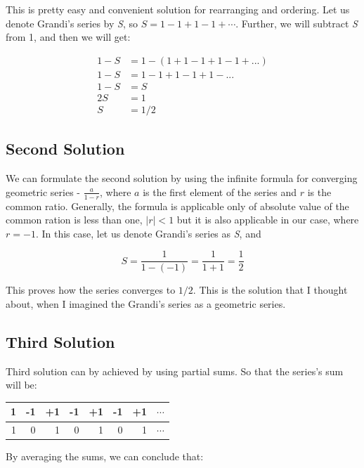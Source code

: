 \documentclass[a4paper]{article}
\begin{document}
This is pretty easy and convenient solution for rearranging and ordering. Let us
denote Grandi’s series by \emph{S}, so $S=1-1+1-1+\cdots$. Further, we will
subtract \emph{S} from 1, and then we will get: 

\begin{align*}
  1-S&=1-(1+1-1+1-1+...)\\
  1-S&=1-1+1-1+1-...\\
  1-S&=S\\
  2S&=1\\
  S&=1/2
\end{align*}

\subsection{Second Solution}
\label{sec-2-2}
\label{sec:second}

We can formulate the second solution by using the infinite formula for
converging geometric series - $\frac{a}{1-r}$, where $a$ is the first element of
the series and $r$ is the common ratio. Generally, the formula is applicable
only of absolute value of the common ration is less than one, $|r| < 1$ but it
is also applicable in our case, where $r = - 1$. In this case, let us denote
Grandi's series as \emph{S}, and 

\begin{equation*}
S=\frac{1}{1-(-1)}=\frac{1}{1+1}=\frac{1}{2}
\end{equation*}

This proves how the series converges to $1/2$. This is the solution that I
thought about, when I imagined the Grandi's series as a geometric series.

\subsection{Third Solution}
\label{sec-2-3}
\label{sec:third}

Third solution can by achieved by using partial sums. So that the series's sum
will be: 

\begin{center}
\begin{tabular}{rrrrrrrl}
1 & -1 & +1 & -1 & +1 & -1 & +1 & $\cdots$\\
\hline
1 & 0 & 1 & 0 & 1 & 0 & 1 & $\cdots$\\
\end{tabular}
\end{center}

By averaging the sums, we can conclude that:
\end{document}
